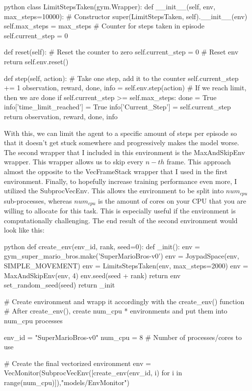 \documentclass{article}
\numberwithin{equation}{section}
\numberwithin{equation}{section}
\begin{document}
\begin{mintedbox}{python}
class LimitStepsTaken(gym.Wrapper):
  def __init__(self, env, max_steps=10000):
    # Constructor
    super(LimitStepsTaken, self).__init__(env)
    self.max_steps = max_steps
    # Counter for steps taken in episode
    self.current_step = 0
  
  def reset(self):
    # Reset the counter to zero
    self.current_step = 0
	# Reset env    
    return self.env.reset()

  def step(self, action):
  	# Take one step, add it to the counter
    self.current_step += 1
    observation, reward, done, info = self.env.step(action)
    # If we reach limit, then we are done 
    if self.current_step >= self.max_steps:
      done = True
      info['time_limit_reached'] = True
    info['Current_Step'] = self.current_step
    return observation, reward, done, info
\end{mintedbox}
With this, we can limit the agent to a specific amount of steps per episode so that it doesn't get stuck somewhere and progressively makes the model worse. The second wrapper that I included in this environment is the MaxAndSkipEnv wrapper. This wrapper allows us to skip every $n-th$ frame. This approach almost the opposite to the VecFrameStack wrapper that I used in the first environment. Finally, to hopefully increase training performance even more, I utilized the SubprocVecEnv. This allows the environment to be split into $num_{cpu}$ sub-processes, whereas $num_{cpu}$ is the amount of cores on your CPU that you are willing to allocate for this task. This is especially useful if the environment is computationally challenging. The end result of the second environment would look like this:

\begin{mintedbox}{python}
def create_env(env_id, rank, seed=0):
    def _init():
        env = gym_super_mario_bros.make('SuperMarioBros-v0')
        env = JoypadSpace(env, SIMPLE_MOVEMENT) 
        env = LimitsStepsTaken(env, max_steps=2000)
        env = MaxAndSkipEnv(env, 4)
        env.seed(seed + rank)
        return env
    set_random_seed(seed)
    return _init 
	
# Create environment and wrapp it accordingly with the create_env() function
# After create_env(), create num_cpu * environments and put them into num_cpu processes

env_id = "SuperMarioBros-v0"
num_cpu = 8  # Number of processes/cores to use

# Create the final vectorized environment
env = VecMonitor(SubprocVecEnv([create_env(env_id, i) for i in range(num_cpu)]),"models/EnvMonitor")
\end{mintedbox}
\end{document}
